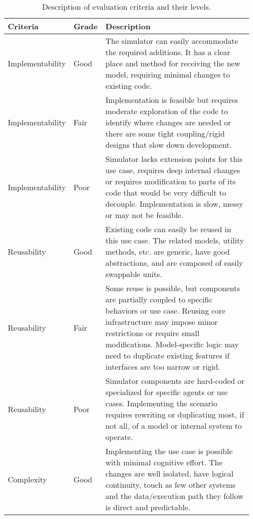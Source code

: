 \documentclass[twoside, 11pt]{article}
\begin{document}
\begin{center}
  \begin{table}[h!]
    \caption[Description of evaluation criteria and their levels]{Description of evaluation criteria and their levels.}
    \begin{tabularx}{\textwidth}{ | p{2.9cm} | l | X | } 
      \hline
      Criteria & Grade & Description \\ 
      \hline
      Implementability & Good & 
      The simulator can easily accommodate the required additions. It has a clear place and method for receiving the new model, requiring minimal changes to existing code.
      \\ 
      \hline
      Implementability & Fair & 
      Implementation is feasible but requires moderate exploration of the code to identify where changes are needed or there are some tight coupling/rigid designs that slow down development.
      \\ 
      \hline
      Implementability & Poor & 
      Simulator lacks extension points for this use case, requires deep internal changes or requires modification to parts of its code that would be very difficult to decouple. Implementation is slow, messy or may not be feasible.
      \\
      \hline
      \hline
      Reusability & Good & 
      Existing code can easily be reused in this use case. The related models, utility methods, etc. are  generic, have good abstractions, and are composed of easily swappable units.
      \\ 
      \hline
      Reusability & Fair & 
      Some reuse is possible, but components are partially coupled to specific behaviors or use case. Reusing core infrastructure may impose minor restrictions or require small modifications. Model-specific logic may need to duplicate existing features if interfaces are too narrow or rigid.
      \\ 
      \hline
      Reusability & Poor & 
      Simulator components are hard-coded or specialized for specific agents or use cases. Implementing the scenario requires rewriting or duplicating most, if not all, of a model or internal system to operate. 
      \\ 
      \hline
      \hline
      Complexity & Good & 
      Implementing the use case is possible with minimal cognitive effort. The changes are well isolated, have logical continuity, touch as few other systems and the data/execution path they follow is direct and predictable.
      \\ 

\end{tabularx}
\end{table}
\end{center}
\end{document}
